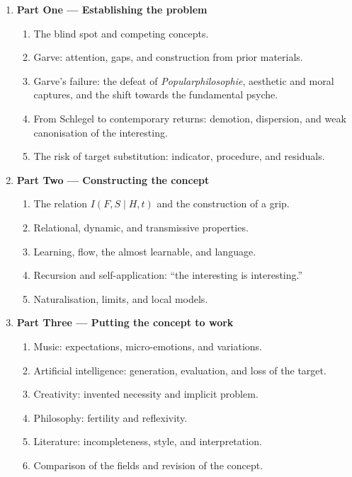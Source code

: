 \documentclass[11pt,a4paper]{article}
\begin{document}
\begin{enumerate}
  \item \textbf{Part One --- Establishing the problem}
    \begin{enumerate}
      \item The blind spot and competing concepts.
      \item Garve: attention, gaps, and construction from prior materials.
      \item Garve's failure: the defeat of \emph{Popularphilosophie}, aesthetic
            and moral captures, and the shift towards the fundamental psyche.
      \item From Schlegel to contemporary returns: demotion, dispersion, and
            weak canonisation of the interesting.
      \item The risk of target substitution: indicator, procedure, and residuals.
    \end{enumerate}
  \item \textbf{Part Two --- Constructing the concept}
    \begin{enumerate}
      \item The relation \(I(F,S\mid H,t)\) and the construction of a grip.
      \item Relational, dynamic, and transmissive properties.
      \item Learning, flow, the almost learnable, and language.
      \item Recursion and self-application: ``the interesting is interesting.''
      \item Naturalisation, limits, and local models.
    \end{enumerate}
  \item \textbf{Part Three --- Putting the concept to work}
    \begin{enumerate}
      \item Music: expectations, micro-emotions, and variations.
      \item Artificial intelligence: generation, evaluation, and loss of the
            target.
      \item Creativity: invented necessity and implicit problem.
      \item Philosophy: fertility and reflexivity.
      \item Literature: incompleteness, style, and interpretation.
      \item Comparison of the fields and revision of the concept.
    \end{enumerate}
\end{enumerate}
\end{document}
